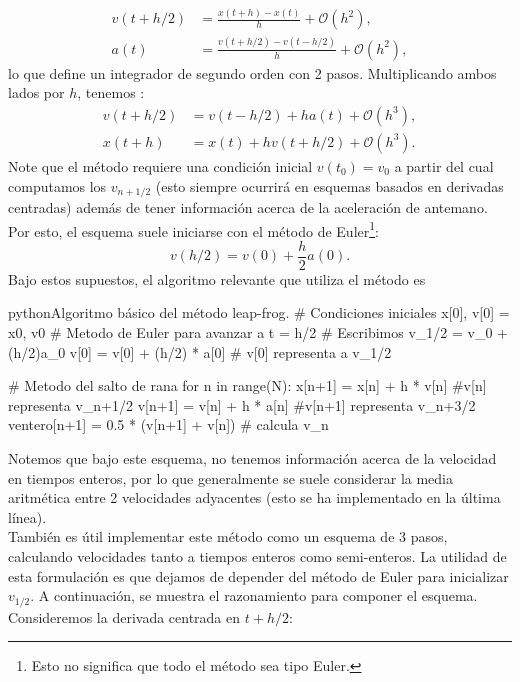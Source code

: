   \begin{align}
    v(t+h/2) &= \frac{x(t+h) - x(t)}{h} + \mathcal{O}(h^2),\\
    a(t) &= \frac{v(t +h/2) - v(t-h/2)}{h} + \mathcal{O}(h^2),
  \end{align}
  lo que define un integrador de segundo orden con 2 pasos. Multiplicando ambos lados por $h$, tenemos :
  \begin{align}
    v(t+h/2) &= v(t-h/2) + ha(t) + \mathcal{O}(h^3),\\
    x(t+h) &= x(t) + hv(t+h/2) + \mathcal{O}(h^3).
  \end{align}
  Note que el método requiere una condición inicial $v(t_0) = v_0$ a partir del cual computamos los $v_{n+1/2}$ (esto siempre ocurrirá en esquemas basados en derivadas centradas) además de tener información acerca de la aceleración de antemano. Por esto, el esquema suele iniciarse con el método de Euler\footnote{Esto no significa que todo el método sea tipo Euler.}:
  $$
  v(h/2) = v(0) + \frac{h}{2}a(0).
  $$
  Bajo estos supuestos, el algoritmo relevante que utiliza el método es     
    \begin{sourcecode}{python}{Algoritmo básico del método leap-frog.}
      # Condiciones iniciales
      x[0], v[0] = x0, v0
      # Metodo de Euler para avanzar a t = h/2
      # Escribimos v_1/2 = v_0 + (h/2)a_0
      v[0] = v[0] + (h/2) * a[0] # v[0] representa a v_1/2
      
      # Metodo del salto de rana
      for n in range(N):
          x[n+1] = x[n] + h * v[n] #v[n] representa v_n+1/2
          v[n+1] = v[n] + h * a[n] #v[n+1] representa v_n+3/2
          ventero[n+1] = 0.5 * (v[n+1] + v[n]) # calcula v_n
    \end{sourcecode}

    Notemos que bajo este esquema, no tenemos información acerca de la velocidad en tiempos enteros, por lo que generalmente se suele considerar la media aritmética entre 2 velocidades adyacentes (esto se ha implementado en la última línea). \\

    También es útil implementar este método como un esquema de 3 pasos, calculando velocidades tanto a tiempos enteros como semi-enteros. La utilidad de esta formulación es que dejamos de depender del método de Euler para inicializar $v_{1/2}$. A continuación, se muestra el razonamiento para componer el esquema.
    Consideremos la derivada centrada en $t+h/2$:

